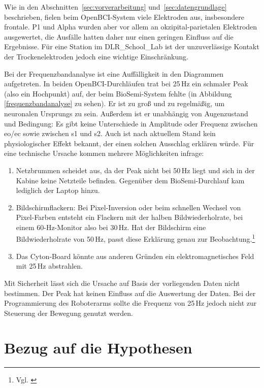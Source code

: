 Wie in den Abschnitten~\ref{sec:vorverarbeitung} und~\ref{sec:datengrundlage} beschrieben, fielen beim OpenBCI-System viele Elektroden aus, insbesondere frontale. P1 und Alpha wurden aber vor allem an okzipital-parietalen Elektroden ausgewertet, die Ausfälle hatten daher nur einen geringen Einfluss auf die Ergebnisse. Für eine Station im DLR\_\allowbreak School\_\allowbreak Lab ist der unzuverlässige Kontakt der Trockenelektroden jedoch eine wichtige Einschränkung. 

Bei der Frequenzbandanalyse ist eine Auffälligkeit in den Diagrammen aufgetreten.
In beiden OpenBCI-Durchläufen trat bei 25\,Hz ein schmaler Peak (also ein Hochpunkt) auf, der beim BioSemi-System fehlte (in Abbildung \ref{frequenzbandanalyse} zu sehen). Er ist zu groß und zu regelmäßig, um neuronalen Ursprungs zu sein. Außerdem ist er unabhängig von Augenzustand und Bedingung: Es gibt keine Unterschiede in Amplitude oder Frequenz zwischen \acrshort{eo}/\acrshort{ec} sowie zwischen s1 und s2. Auch ist nach aktuellem Stand kein physiologischer Effekt bekannt, der einen solchen Ausschlag erklären würde. Für eine technische Ursache kommen mehrere Möglichkeiten infrage:

\begin{enumerate}
  \item Netzbrummen scheidet aus, da der Peak nicht bei 50\,Hz liegt und sich in der Kabine keine Netzteile befinden. Gegenüber dem BioSemi-Durchlauf kam lediglich der Laptop hinzu.
  \item Bildschirmflackern: Bei Pixel-Inversion oder beim schnellen Wechsel von Pixel-Farben entsteht ein Flackern mit der halben Bildwiederholrate, bei einem 60-Hz-Monitor also bei 30\,Hz. Hat der Bildschirm eine Bildwiederholrate von 50\,Hz, passt diese Erklärung genau zur Beobachtung.\footnote{Vgl. \cite{flickersense_led_screens}} 
  \item Das Cyton-Board könnte aus anderen Gründen ein elektromagnetisches Feld mit 25\,Hz abstrahlen.
\end{enumerate}

Mit Sicherheit lässt sich die Ursache auf Basis der vorliegenden Daten nicht bestimmen. Der Peak hat keinen Einfluss auf die Auswertung der Daten. Bei der Programmierung des Roboterarms sollte die Frequenz von 25\,Hz jedoch nicht zur Steuerung der Bewegung genutzt werden.

\section{Bezug auf die Hypothesen}

